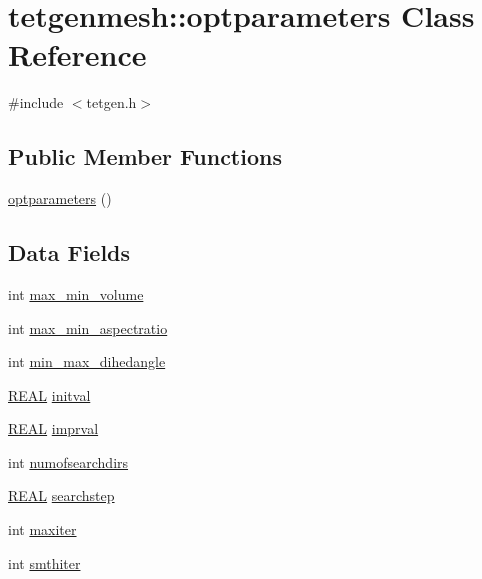 \hypertarget{classtetgenmesh_1_1optparameters}{}\section{tetgenmesh\+:\+:optparameters Class Reference}
\label{classtetgenmesh_1_1optparameters}


{\ttfamily \#include $<$tetgen.\+h$>$}

\subsection*{Public Member Functions}
\begin{DoxyCompactItemize}
\item 
\hyperlink{classtetgenmesh_1_1optparameters_a06ae553af1e16ec6e9495d3e04dd53bb}{optparameters} ()
\end{DoxyCompactItemize}
\subsection*{Data Fields}
\begin{DoxyCompactItemize}
\item 
int \hyperlink{classtetgenmesh_1_1optparameters_ac9adc44bb0076f3b2e5c11c0bf831278}{max\+\_\+min\+\_\+volume}
\item 
int \hyperlink{classtetgenmesh_1_1optparameters_a844aa0c436ff6021d3c1f7132584faa6}{max\+\_\+min\+\_\+aspectratio}
\item 
int \hyperlink{classtetgenmesh_1_1optparameters_ab391511f633b84180d0e6cc52510e343}{min\+\_\+max\+\_\+dihedangle}
\item 
\hyperlink{tetgen_8h_a4b654506f18b8bfd61ad2a29a7e38c25}{R\+E\+AL} \hyperlink{classtetgenmesh_1_1optparameters_a06ad962f12e69b344f409f6e835d27ec}{initval}
\item 
\hyperlink{tetgen_8h_a4b654506f18b8bfd61ad2a29a7e38c25}{R\+E\+AL} \hyperlink{classtetgenmesh_1_1optparameters_a5415643a8bf717ea781e97d56d725173}{imprval}
\item 
int \hyperlink{classtetgenmesh_1_1optparameters_af6ea36aeb4f65aa694e3df5c6dcd3a8d}{numofsearchdirs}
\item 
\hyperlink{tetgen_8h_a4b654506f18b8bfd61ad2a29a7e38c25}{R\+E\+AL} \hyperlink{classtetgenmesh_1_1optparameters_ace9dd689b3cb7b135573b46fbf6afed2}{searchstep}
\item 
int \hyperlink{classtetgenmesh_1_1optparameters_a0f2b3bd97f2120bdb77acb9e89026196}{maxiter}
\item 
int \hyperlink{classtetgenmesh_1_1optparameters_a7c01e6bed6c1f6188f7408f84b9644d9}{smthiter}
\end{DoxyCompactItemize}


